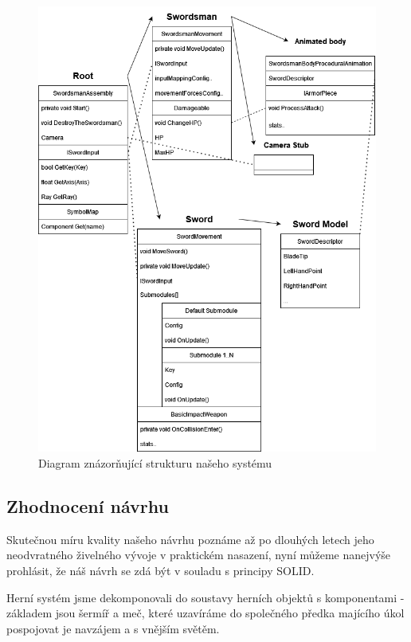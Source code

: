 \begin{figure}[ht]\centering
    \center
    \includegraphics[width=145mm]{../img/Structure-diagram.png}
    \caption{Diagram znázorňující strukturu našeho systému}
    \label{obr04:objectModelDiagram}
\end{figure} 

\subsection{Zhodnocení návrhu} 

Skutečnou míru kvality našeho návrhu poznáme až po dlouhých letech jeho neodvratného živelného vývoje v praktickém nasazení, nyní můžeme nanejvýše prohlásit, že náš návrh se zdá být v souladu s principy SOLID. 

Herní systém jsme dekomponovali do soustavy herních objektů s komponentami - základem jsou šermíř a meč, které uzavíráme do společného předka majícího úkol pospojovat je navzájem a s vnějším světěm. 

